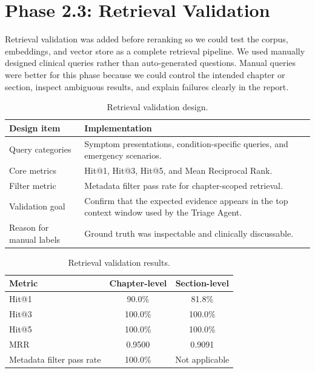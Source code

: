\section{Phase 2.3: Retrieval Validation}

Retrieval validation was added before reranking so we could test the corpus, embeddings, and vector store as a complete retrieval pipeline. We used manually designed clinical queries rather than auto-generated questions. Manual queries were better for this phase because we could control the intended chapter or section, inspect ambiguous results, and explain failures clearly in the report.

\begin{table}[htbp]
\centering
\caption{Retrieval validation design.}
\label{tab:retrieval_validation_design}
\begin{tabular}{p{} p{}}
\toprule
\textbf{Design item} & \textbf{Implementation}\\
\midrule
Query categories & Symptom presentations, condition-specific queries, and emergency scenarios.\\
Core metrics & Hit@1, Hit@3, Hit@5, and Mean Reciprocal Rank.\\
Filter metric & Metadata filter pass rate for chapter-scoped retrieval.\\
Validation goal & Confirm that the expected evidence appears in the top context window used by the Triage Agent.\\
Reason for manual labels & Ground truth was inspectable and clinically discussable.\\
\bottomrule
\end{tabular}
\end{table}

\begin{table}[htbp]
\centering
\caption{Retrieval validation results.}
\label{tab:retrieval_results}
\begin{tabular}{p{} c c}
\toprule
\textbf{Metric} & \textbf{Chapter-level} & \textbf{Section-level}\\
\midrule
Hit@1 & 90.0\% & 81.8\%\\
Hit@3 & 100.0\% & 100.0\%\\
Hit@5 & 100.0\% & 100.0\%\\
MRR & 0.9500 & 0.9091\\
Metadata filter pass rate & 100.0\% & Not applicable\\
\bottomrule
\end{tabular}
\end{table}

